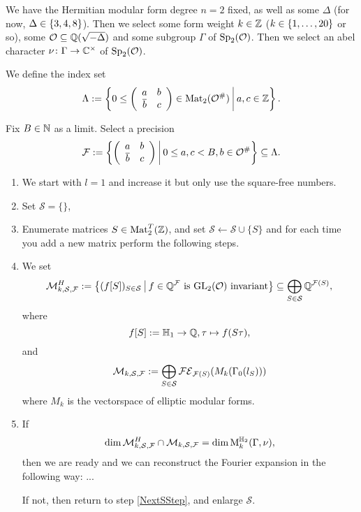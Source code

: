 \begin{algo}
We have the Hermitian modular form degree $n = 2$ fixed, as well as some $\Delta$ (for now, $\Delta \in \Set{3,4,8}$). Then we select some form weight $k \in \mathbb{Z}$ ($k \in \Set{1,\dots,20}$ or so), some $\mathcal{O} \subseteq \mathbb{Q}(\sqrt{-\Delta})$ and some subgroup $\Gamma$ of $\operatorname{Sp}_2(\mathcal{O})$. Then we select an abel character $\nu \colon \Gamma \rightarrow \mathbb{C}^\times$ of $\operatorname{Sp}_2(\mathcal{O})$.

We define the index set
\[ \Lambda := \Set{0 \le \SimpleMatrix{a}{b}{\overline b}{c} \in \M_2(\curlO^\#)}{a,c \in \Z } . \]

Fix $B \in \mathbb{N}$ as a limit. Select a precision
\[ \F := \Set{\SimpleMatrix{a}{b}{\overline b}{c}}{0 \le a , c < B, b \in \curlO^\#} \subseteq \Lambda . \]

\begin{enumerate}
\item We start with $l = 1$ and increase it but only use the square-free numbers.
\item Set $\mathcal{S} = \{\}$,
\item\label{NextSStep} Enumerate matrices $S \in \operatorname{Mat}_2^T(\mathbb{Z})$, and set $\mathcal{S} \leftarrow \mathcal{S} \cup \{ S \}$ and for each time you add a new matrix perform the following steps.


\item We set
\[ \mathcal{M}_{k,\mathcal{S},\F}^H := \Set{ (f [S])_{S\in\mathcal{S}} }{\text{$f \in \Q^\F$ is $\GL_2(\curlO)$ invariant}} \subseteq \bigoplus_{S\in\mathcal{S}} \Q^{\F(S)} , \]
where
\[ f[S] := \mathbb{H}_1 \rightarrow \mathbb{Q}, \tau \mapsto f(S \tau), \]
and
\[ \mathcal{M}_{k, \mathcal{S},\mathcal{F}} := \bigoplus_{S\in\mathcal{S}} \mathcal{FE}_{\mathcal{F}(S)}(M_k(\Gamma_0(l_S))) \]
where $M_k$ is the vectorspace of elliptic modular forms. %

\item
If
\[ \dim \mathcal{M}_{k,\mathcal{S},\mathcal{F}}^H \cap \mathcal{M}_{k, \mathcal{S},\mathcal{F}}
= \dim \operatorname{M}^{\mathbb{H}_{2}}_k (\Gamma,\nu) , \]
then we are ready and we can reconstruct the Fourier expansion in the following way: ...

If not, then return to step \ref{NextSStep}, and enlarge $\mathcal{S}$.
\end{enumerate}
\end{algo}

